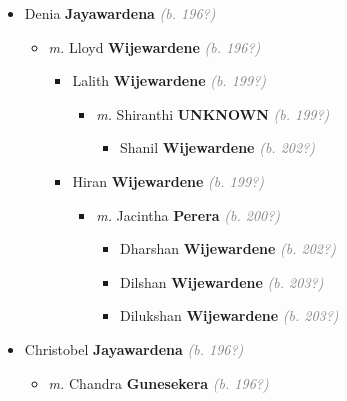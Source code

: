 \documentclass[10pt, openany]{book}
\begin{document}
\begin{itemize}
{\begin{itemize}
{\begin{itemize}
{\begin{itemize}
{\begin{itemize}
\end{itemize}
   }
\item{Denia \textbf{Jayawardena} \textcolor{gray}{\textit{(b. 196?)}}
\begin{itemize}
\item{\textit{m.} Lloyd \textbf{Wijewardene} \textcolor{gray}{\textit{(b. 196?)}}   \label{couple:00003307:00003308} \begin{itemize}
\item{Lalith  \textbf{Wijewardene} \textcolor{gray}{\textit{(b. 199?)}}
\begin{itemize}
\item{\textit{m.} Shiranthi \textbf{UNKNOWN} \textcolor{gray}{\textit{(b. 199?)}}   \label{couple:00003309:00003310} \begin{itemize}
\item{Shanil  \textbf{Wijewardene} \textcolor{gray}{\textit{(b. 202?)}}
 }
\end{itemize}}
\end{itemize}
 }
\item{Hiran  \textbf{Wijewardene} \textcolor{gray}{\textit{(b. 199?)}}
\begin{itemize}
\item{\textit{m.} Jacintha \textbf{Perera} \textcolor{gray}{\textit{(b. 200?)}}   \label{couple:00003312:00003313} \begin{itemize}
\item{Dharshan  \textbf{Wijewardene} \textcolor{gray}{\textit{(b. 202?)}}
 }
\item{Dilshan  \textbf{Wijewardene} \textcolor{gray}{\textit{(b. 203?)}}
 }
\item{Dilukshan  \textbf{Wijewardene} \textcolor{gray}{\textit{(b. 203?)}}
 }
\end{itemize}}
\end{itemize}
 }
\end{itemize}}
\end{itemize}
 }
\item{Christobel \textbf{Jayawardena} \textcolor{gray}{\textit{(b. 196?)}}
\begin{itemize}
\item{\textit{m.} Chandra \textbf{Gunesekera} \textcolor{gray}{\textit{(b. 196?)}}   \label{couple:00003320:00003321} \begin{itemize}

\end{itemize}}
\end{itemize}}
\end{itemize}}
\end{itemize}}
\end{itemize}}
\end{itemize}
\end{document}
